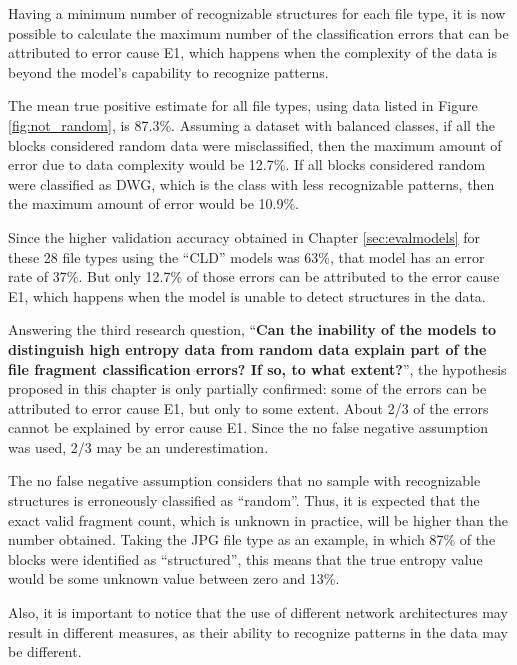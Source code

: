 Having a minimum number of recognizable structures for each file type, it is now possible to calculate the maximum number of the classification errors that can be attributed to error cause E1, which happens when the complexity of the data is beyond the model’s capability to recognize patterns.

The mean true positive estimate for all file types, using data listed in Figure \ref{fig:not_random}, is 87.3\%.  Assuming a dataset with balanced classes, if all the blocks considered random data were misclassified, then the maximum amount of error due to data complexity would be 12.7\%. If all blocks considered random were classified as DWG, which is the class with less recognizable patterns, then the maximum amount of error would be 10.9\%.

Since the higher validation accuracy obtained in Chapter \ref{sec:evalmodels} for these 28 file types using the ``CLD'' models was 63\%, that model has an error rate of 37\%. But only 12.7\% of those errors can be attributed to the error cause E1, which happens when the model is unable to detect structures in the data.

Answering the third research question, ``\textbf{Can the inability of the models to distinguish high entropy data from random data explain part of the file fragment classification errors? If so, to what extent?}'',
the hypothesis proposed in this chapter is only partially confirmed: some of the errors can be attributed to error cause E1, but only to some extent. About 2/3 of the errors cannot be explained by error cause E1. Since the no false negative assumption was used, 2/3 may be an underestimation.

The no false negative assumption considers that no sample with recognizable structures is erroneously classified as ``random''. Thus, it is expected that the exact valid fragment count, which is unknown in practice, will be higher than the number obtained. Taking the JPG file type as an example, in which 87\% of the blocks were identified as ``structured'', this means that the true entropy value would be some unknown value between zero and 13\%.

Also, it is important to notice that the use of different network architectures may result in different measures, as their ability to recognize patterns in the data may be different.
